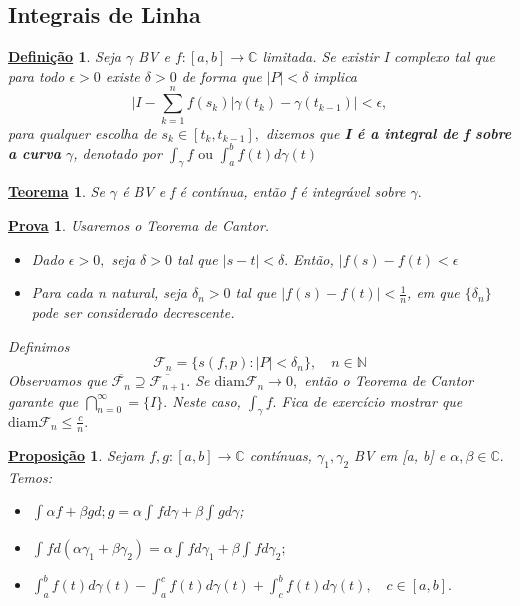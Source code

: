\documentclass{article}
\newtheorem*{def*}{\underline{Defini\c c\~ao}}
\newtheorem*{theorem*}{\underline{Teorema}}
\newtheorem*{proof*}{\underline{Prova}}
\newtheorem*{prop*}{\underline{Proposi\c c\~ao}}
\begin{document}
  \subsection{Integrais de Linha}
  \begin{def*}
    Seja $\gamma$ BV e $f:[a, b]\rightarrow \mathbb{C}$ limitada. Se existir I complexo tal que para todo $\epsilon > 0$ existe $\delta > 0$
    de forma que $|P| < \delta$ implica
    $$
    \biggl|I - \sum\limits_{k=1}^{n}f(s_{k})|\gamma(t_{k}) - \gamma(t_{k-1})\biggr| < \epsilon,
    $$
    para qualquer escolha de $s_{k}\in{[t_{k}, t_{k-1}]},$ dizemos que \textbf{I \'e a integral de f sobre a curva }$\gamma$, denotado por
    $\int_{\gamma}^{}f\text{ ou } \int_{a}^{b}f(t)d\gamma(t)$
  \end{def*}
  \begin{theorem*}
    Se $\gamma$ \'e BV e f \'e cont\'inua, ent\~ao f \'e integr\'avel sobre $\gamma.$
  \end{theorem*}
  \begin{proof*}
    Usaremos o Teorema de Cantor.
    \begin{itemize}
      \item[1)] Dado $\epsilon > 0,$ seja $\delta > 0$ tal que $|s-t| < \delta.$ Ent\~ao, $|f(s) - f(t) < \epsilon$
      \item[2)] Para cada n natural, seja $\delta_{n} > 0$ tal que $|f(s) - f(t)| < \frac{1}{n}$, em que $\{\delta_{n}\}$ pode ser 
        considerado decrescente. 
    \end{itemize}

    Definimos 
    $$
    \mathcal{F}_{n} = \{s(f, p): |P| < \delta_{n}\}, \quad n\in \mathbb{N}
    $$
    Observamos que  $\overline{\mathcal{F}_{n}}\supseteq\overline{\mathcal{F}_{n+1}}$. Se $\mathrm{diam} \mathcal{F}_{n}\to{0},$ ent\~ao
    o Teorema de Cantor garante que $\bigcap_{n=0}^{\infty} = \{I\}.$ Neste caso, $\int_{\gamma}^{}f.$ Fica de exerc\'icio mostrar que
    $\mathrm{diam} \mathcal{F}_{n}\leq \frac{c}{n}.$
  \end{proof*}
  \begin{prop*}
    Sejam $f, g:[a, b]\rightarrow \mathbb{C}$ cont\'inuas, $\gamma_{1}, \gamma_2$ BV em [a, b] e $\alpha, \beta\in{\mathbb{C}}.$
    Temos: 
    \begin{itemize}
      \item[i)] $\int_{}^{}\alpha f + \beta g d;g = \alpha \int_{}^{}fd \gamma + \beta \int_{}^{}gd \gamma$;
      \item[ii)] $\int_{}^{}f d(\alpha \gamma_1 + \beta \gamma_2) = \alpha\int_{}^{}f d \gamma_1 + \beta \int_{}^{}f d \gamma_2;$
      \item[iii)] $\int_{a}^{b}f(t)d \gamma(t) - \int_{a}^{c}f(t)d \gamma(t) + \int_{c}^{b}f(t) d \gamma(t), \quad c\in{[a, b]}.$
    \end{itemize}
  \end{prop*}
\end{document}
